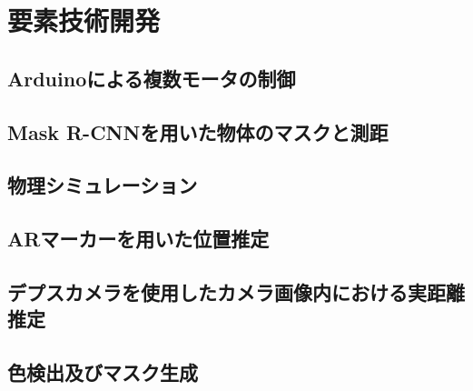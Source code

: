 \chapter{要素技術開発}
\newpage

\section{Arduinoによる複数モータの制御}



\section{Mask R-CNNを用いた物体のマスクと測距}



\section{物理シミュレーション}



\section{ARマーカーを用いた位置推定}



\section{デプスカメラを使用したカメラ画像内における実距離推定}



\section{色検出及びマスク生成}